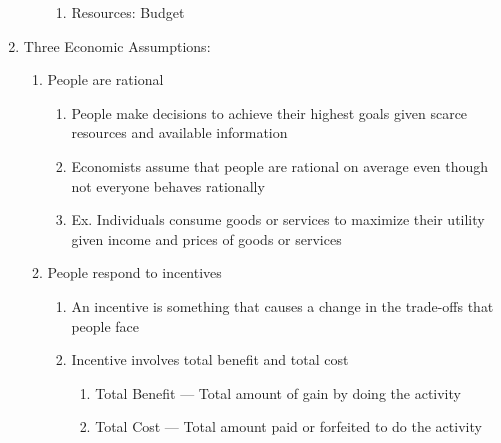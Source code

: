\documentclass[12pt]{article}
\begin{document}
\begin{enumerate}
\begin{enumerate}
\begin{enumerate}
              \item Resources: Budget

            \end{enumerate}

        \end{enumerate}

      \item Three Economic Assumptions:

        \begin{enumerate}

          \item People are rational

            \begin{enumerate}

              \item People make decisions to achieve their highest goals given scarce resources and available information

              \item Economists assume that people are rational on average even though not everyone behaves rationally

              \item Ex. Individuals consume goods or services to maximize their utility given income and prices of goods or services

            \end{enumerate}

          \item People respond to incentives

            \begin{enumerate}

              \item An incentive is something that causes a change in the trade-offs that people face

              \item Incentive involves total benefit and total cost

                \begin{enumerate}

                  \item Total Benefit — Total amount of gain by doing the activity

                  \item Total Cost — Total amount paid or forfeited to do the activity

                \end{enumerate}


\end{enumerate}
\end{enumerate}
\end{enumerate}
\end{document}
